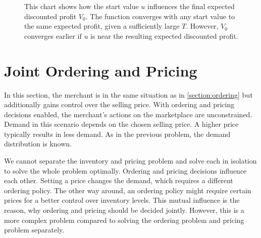 \begin{figure}[t]
\caption{This chart shows how the start value $u$ influences the final expected discounted profit $V_0$. The function converges with any start value to the same expected profit, given a sufficiently large $T$. However, $V_0$ converges earlier if $u$ is near the resulting expected discounted profit.}
\label{fig:convergence}
\end{figure}


\section{Joint Ordering and Pricing}
\label{section:joint_ordering_pricing}
In this section, the merchant is in the same situation as in \cref{section:ordering} but additionally gains control over the selling price.
With ordering and pricing decisions enabled, the merchant's actions on the marketplace are unconstrained.
Demand in this scenario depends on the chosen selling price.
A higher price typically results in less demand.
As in the previous problem, the demand distribution is known.

We cannot separate the inventory and pricing problem and solve each in isolation to solve the whole problem optimally.
Ordering and pricing decisions influence each other.
Setting a price changes the demand, which requires a different ordering policy.
The other way around, an ordering policy might require certain prices for a better control over inventory levels.
This mutual influence is the reason, why ordering and pricing should be decided jointly.
However, this is a more complex problem compared to solving the ordering problem and pricing problem separately.


